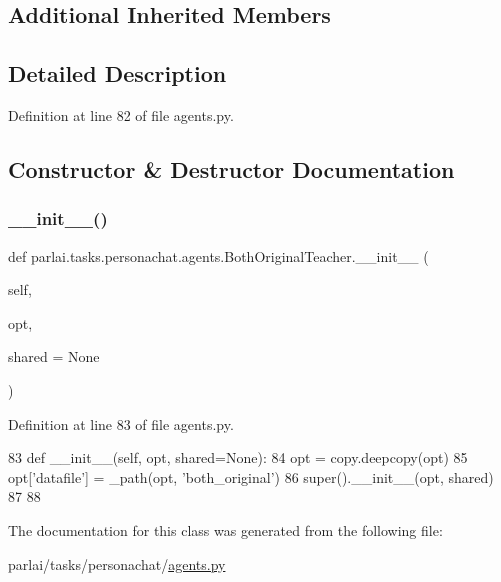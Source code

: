 \subsection*{Additional Inherited Members}


\subsection{Detailed Description}


Definition at line 82 of file agents.\+py.



\subsection{Constructor \& Destructor Documentation}
\mbox{\label{classparlai_1_1tasks_1_1personachat_1_1agents_1_1BothOriginalTeacher_a9d8162c6d1b012a1c9961f0aaedcb9cf}} 
\subsubsection{\texorpdfstring{\+\_\+\+\_\+init\+\_\+\+\_\+()}{\_\_init\_\_()}}
{\footnotesize\ttfamily def parlai.\+tasks.\+personachat.\+agents.\+Both\+Original\+Teacher.\+\_\+\+\_\+init\+\_\+\+\_\+ (\begin{DoxyParamCaption}\item[{}]{self,  }\item[{}]{opt,  }\item[{}]{shared = {\ttfamily None} }\end{DoxyParamCaption})}



Definition at line 83 of file agents.\+py.


\begin{DoxyCode}
83     \textcolor{keyword}{def }\_\_init\_\_(self, opt, shared=None):
84         opt = copy.deepcopy(opt)
85         opt[\textcolor{stringliteral}{'datafile'}] = \_path(opt, \textcolor{stringliteral}{'both\_original'})
86         super().\_\_init\_\_(opt, shared)
87 
88 
\end{DoxyCode}


The documentation for this class was generated from the following file\+:\begin{DoxyCompactItemize}
\item 
parlai/tasks/personachat/\hyperlink{parlai_2tasks_2personachat_2agents_8py}{agents.\+py}\end{DoxyCompactItemize}
